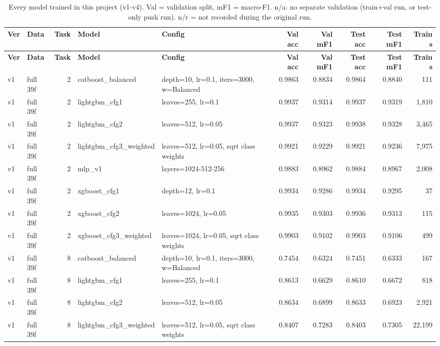 {\tiny
\begin{longtable}{llrp{3.2cm}p{4.4cm}rrrrr}
\caption{Every model trained in this project (v1-v4). Val = validation split, mF1 = macro-F1. n/a: no separate validation (train+val run, or test-only push run). n/r = not recorded during the original run.}\label{tab:allmodels}\\
\toprule
\textbf{Ver} & \textbf{Data} & \textbf{Task} & \textbf{Model} & \textbf{Config} & \textbf{Val acc} & \textbf{Val mF1} & \textbf{Test acc} & \textbf{Test mF1} & \textbf{Train s} \\
\midrule
\endfirsthead
\toprule
\textbf{Ver} & \textbf{Data} & \textbf{Task} & \textbf{Model} & \textbf{Config} & \textbf{Val acc} & \textbf{Val mF1} & \textbf{Test acc} & \textbf{Test mF1} & \textbf{Train s} \\
\midrule
\endhead
v1 & full 39f & 2 & catboost\_balanced & depth=10, lr=0.1, iters=3000, w=Balanced & 0.9863 & 0.8834 & 0.9864 & 0.8840 & 111 \\
v1 & full 39f & 2 & lightgbm\_cfg1 & leaves=255, lr=0.1 & 0.9937 & 0.9314 & 0.9937 & 0.9319 & 1,810 \\
v1 & full 39f & 2 & lightgbm\_cfg2 & leaves=512, lr=0.05 & 0.9937 & 0.9323 & 0.9938 & 0.9328 & 3,465 \\
v1 & full 39f & 2 & lightgbm\_cfg3\_weighted & leaves=512, lr=0.05, sqrt class weights & 0.9921 & 0.9229 & 0.9921 & 0.9236 & 7,975 \\
v1 & full 39f & 2 & mlp\_v1 & layers=1024-512-256 & 0.9883 & 0.8962 & 0.9884 & 0.8967 & 2,008 \\
v1 & full 39f & 2 & xgboost\_cfg1 & depth=12, lr=0.1 & 0.9934 & 0.9286 & 0.9934 & 0.9295 & 37 \\
v1 & full 39f & 2 & xgboost\_cfg2 & leaves=1024, lr=0.05 & 0.9935 & 0.9303 & 0.9936 & 0.9313 & 115 \\
v1 & full 39f & 2 & xgboost\_cfg3\_weighted & leaves=1024, lr=0.05, sqrt class weights & 0.9903 & 0.9102 & 0.9903 & 0.9106 & 499 \\
v1 & full 39f & 8 & catboost\_balanced & depth=10, lr=0.1, iters=3000, w=Balanced & 0.7454 & 0.6324 & 0.7451 & 0.6333 & 167 \\
v1 & full 39f & 8 & lightgbm\_cfg1 & leaves=255, lr=0.1 & 0.8613 & 0.6629 & 0.8610 & 0.6672 & 818 \\
v1 & full 39f & 8 & lightgbm\_cfg2 & leaves=512, lr=0.05 & 0.8634 & 0.6899 & 0.8633 & 0.6923 & 2,921 \\
v1 & full 39f & 8 & lightgbm\_cfg3\_weighted & leaves=512, lr=0.05, sqrt class weights & 0.8407 & 0.7283 & 0.8403 & 0.7305 & 22,199 \\

\end{longtable}}
